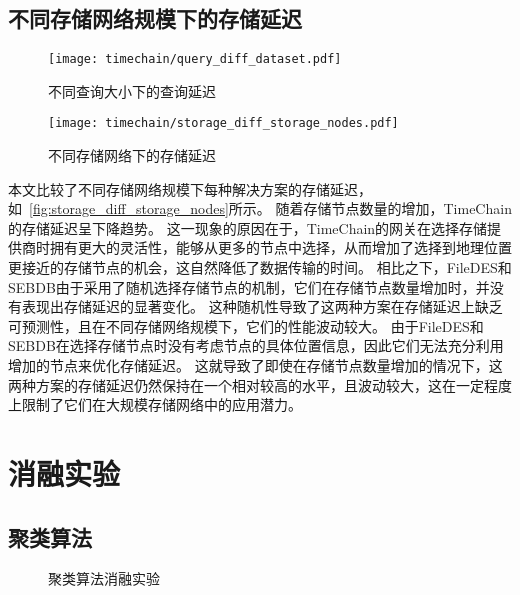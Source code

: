 \subsection{不同存储网络规模下的存储延迟}
\begin{figure}[t]
    \centering
	\begin{minipage}{0.4\linewidth}
        \centering
        \texttt{[image: timechain/query\_diff\_dataset.pdf]}
        \caption{不同查询大小下的查询延迟}
        \label{fig:query_diff_dataset}
	\end{minipage}
	\quad
	\begin{minipage}{0.4\linewidth}
        \centering
        \texttt{[image: timechain/storage\_diff\_storage\_nodes.pdf]}
        \caption{不同存储网络下的存储延迟}
        \label{fig:storage_diff_storage_nodes}
    \end{minipage}
\end{figure}
本文比较了不同存储网络规模下每种解决方案的存储延迟，如~\autoref{fig:storage_diff_storage_nodes}所示。
随着存储节点数量的增加，TimeChain的存储延迟呈下降趋势。
这一现象的原因在于，TimeChain的网关在选择存储提供商时拥有更大的灵活性，能够从更多的节点中选择，从而增加了选择到地理位置更接近的存储节点的机会，这自然降低了数据传输的时间。
相比之下，FileDES和SEBDB由于采用了随机选择存储节点的机制，它们在存储节点数量增加时，并没有表现出存储延迟的显著变化。
这种随机性导致了这两种方案在存储延迟上缺乏可预测性，且在不同存储网络规模下，它们的性能波动较大。
由于FileDES和SEBDB在选择存储节点时没有考虑节点的具体位置信息，因此它们无法充分利用增加的节点来优化存储延迟。
这就导致了即使在存储节点数量增加的情况下，这两种方案的存储延迟仍然保持在一个相对较高的水平，且波动较大，这在一定程度上限制了它们在大规模存储网络中的应用潜力。

\section{消融实验}
\subsection{聚类算法}
\begin{figure*}[t]
    \centering
	\begin{minipage}{0.9\linewidth}
        \quad
        \caption{聚类算法消融实验} 
    \end{minipage}
\end{figure*}


